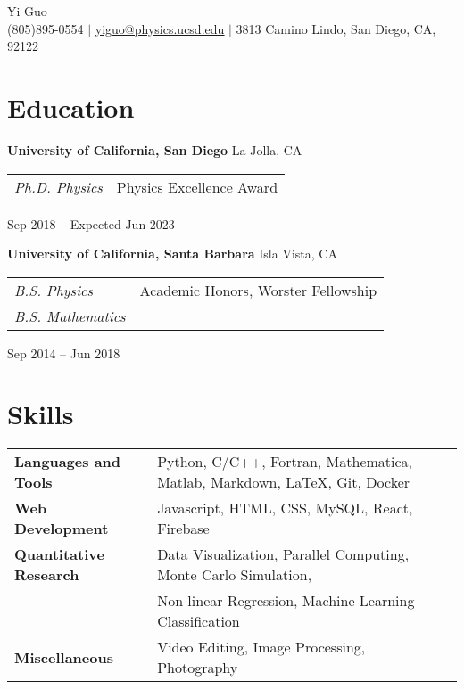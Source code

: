 \documentclass[letterpaper,12pt]{article}
\begin{document}
\newcommand{\name}{Yi Guo}
\newcommand{\phone}{(805)895-0554}
\newcommand{\email}{yiguo@physics.ucsd.edu}
\newcommand{\address}{3813 Camino Lindo, San Diego, CA, 92122}
\newcommand{\github}{y1guo}
\newcommand{\linkedin}{y1guo}
\newcommand{\website}{https://y1guo.github.io}

\begin{center}
    \Huge \name \\
    \vspace{1pt}
    \small \phone 
    $|$ \href{mailto:\email}{\underline{\email}} 
    $|$ \address
    \vspace{-15pt}
\end{center}


\section{Education}

\textbf{University of California, San Diego} \hfill La Jolla, CA \\
\begin{tabular}{p{10em} p{20em}}
    \textit{Ph.D. Physics} 
    & Physics Excellence Award 
\end{tabular}
\hfill Sep 2018 -- Expected Jun 2023

\textbf{University of California, Santa Barbara} \hfill Isla Vista, CA \\
\begin{tabular}{p{10em} p{20em}}
    \textit{B.S. Physics}
    & Academic Honors, Worster Fellowship \\
    \textit{B.S. Mathematics}
    &
\end{tabular}
\hfill Sep 2014 -- Jun 2018


\section{Skills}

\begin{tabular}{p{10em} p{33em}}
    \textbf{Languages and Tools} 
    & Python, C/C++, Fortran, Mathematica, Matlab, Markdown, \LaTeX, Git, Docker \\
    \textbf{Web Development}
    & Javascript, HTML, CSS, MySQL, React, Firebase \\
    \textbf{Quantitative Research} 
    & Data Visualization, Parallel Computing, Monte Carlo Simulation, \\
    & Non-linear Regression, Machine Learning Classification \\
    \textbf{Miscellaneous} 
    & Video Editing, Image Processing, Photography
\end{tabular}
\end{document}
